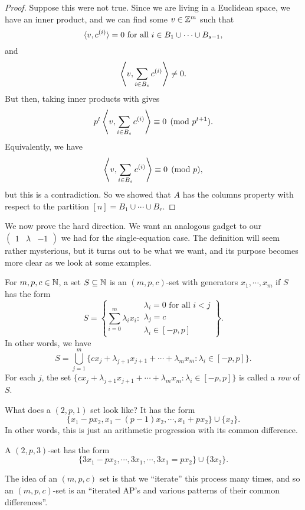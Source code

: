 \documentclass[a4paper]{article}
\begin{document}
\begin{proof}
    Suppose this were not true. Since we are living in a Euclidean space, we have an inner product, and we can find some $v \in \mathbb{Z}^m$ such that
    \[
      \langle v, c^{(i)} \rangle = 0\text{ for all }i \in B_1 \cup \cdots \cup B_{s - 1},
    \]
    and
    \[
      \left\langle v, \sum_{i \in B_s}c^{(i)}\right\rangle \not= 0.
    \]
    But then, taking inner products with gives
    \[
      p^t \left\langle v, \sum_{i \in B_s} c^{(i)}\right\rangle \equiv 0 \pmod {p^{t + 1}}.
    \]
    Equivalently, we have
    \[
      \left\langle v, \sum_{i \in B_s}c^{(i)}\right\rangle \equiv 0 \pmod p,
    \]
    but this is a contradiction. So we showed that $A$ has the columns property with respect to the partition $[n] = B_1 \cup \cdots \cup B_r$.
  \end{proof}

  We now prove the hard direction. We want an analogous gadget to our $\begin{pmatrix}1 & \lambda & -1\end{pmatrix}$ we had for the single-equation case. The definition will seem rather mysterious, but it turns out to be what we want, and its purpose becomes more clear as we look at some examples.

  \begin{defi}[$(m, p, c)$-set]
    For $m, p, c \in \mathbb{N}$, a set $S \subseteq \mathbb{N}$ is an $(m, p, c)$-set with generators $x_1, \cdots, x_m$ if $S$ has the form
    \[
      S = \left\{ \sum_{i = 0}^m \lambda_i x_i : \begin{array}{c}\lambda_i = 0 \text{ for all }i < j\\ \lambda_j = c\\ \lambda_i \in [-p, p]\end{array}\right\}.
    \]
    In other words, we have
    \[
      S = \bigcup_{j = 1}^m \{c x_j + \lambda_{j + 1} x_{j + 1} + \cdots + \lambda_m x_m : \lambda_i \in [-p, p]\}.
    \]
    For each $j$, the set $\{c x_j + \lambda_{j + 1} x_{j + 1} + \cdots + \lambda_m x_m: \lambda_i \in [-p, p]\}$ is called a \emph{row} of $S$.
  \end{defi}

  \begin{eg}
    What does a $(2, p, 1)$ set look like? It has the form
    \[
      \{x_1 - p x_2, x_1 - (p - 1) x_2, \cdots, x_1 + p x_2\} \cup \{x_2\}.
    \]
    In other words, this is just an arithmetic progression with its common difference.
  \end{eg}

  \begin{eg}
    A $(2, p, 3)$-set has the form
    \[
      \{3x_1 - p x_2, \cdots, 3 x_1, \cdots, 3 x_1 = p x_2\} \cup \{3 x_2\}.
    \]
  \end{eg}
  The idea of an $(m, p, c)$ set is that we ``iterate'' this process many times, and so an $(m, p, c)$-set is an ``iterated AP's and various patterns of their common differences''.
\end{document}
